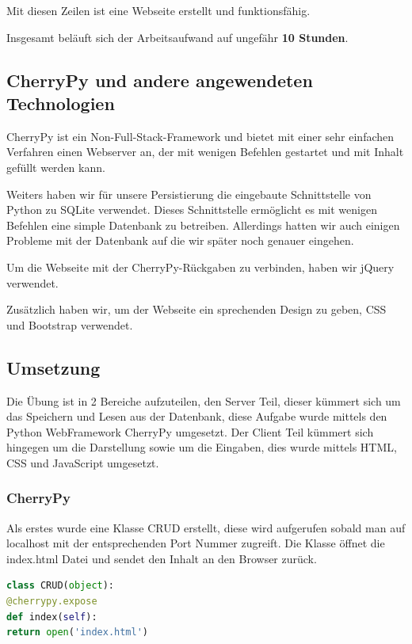Mit diesen Zeilen ist eine Webseite erstellt und funktionsfähig.

Insgesamt beläuft sich der Arbeitsaufwand auf ungefähr \textbf{10 Stunden}.

\subsection{CherryPy und andere angewendeten Technologien}

CherryPy ist ein Non-Full-Stack-Framework und bietet mit einer sehr einfachen Verfahren einen Webserver an, der mit wenigen Befehlen gestartet und mit Inhalt gefüllt werden kann.

Weiters haben wir für unsere Persistierung die eingebaute Schnittstelle von Python zu SQLite verwendet. Dieses Schnittstelle ermöglicht es mit wenigen Befehlen eine simple Datenbank zu betreiben. Allerdings hatten wir auch einigen Probleme mit der Datenbank auf die wir später noch genauer eingehen.

Um die Webseite mit der CherryPy-Rückgaben zu verbinden, haben wir jQuery verwendet. 

Zusätzlich haben wir, um der Webseite ein sprechenden Design zu geben, CSS und Bootstrap verwendet. 


\subsection{Umsetzung}

Die Übung ist in 2 Bereiche aufzuteilen, den Server Teil, dieser kümmert sich um das Speichern und Lesen aus der Datenbank, diese Aufgabe wurde mittels den Python WebFramework CherryPy umgesetzt. Der Client Teil kümmert sich hingegen um die Darstellung sowie um die Eingaben, dies wurde mittels HTML, CSS und JavaScript umgesetzt.

\subsubsection{CherryPy}

Als erstes wurde eine Klasse CRUD erstellt, diese wird aufgerufen sobald man auf localhost mit der entsprechenden Port Nummer zugreift. Die Klasse öffnet die index.html Datei und sendet den Inhalt an den Browser zurück.

\begin{lstlisting}[language=Python, caption=Klasse zur Darstellung der Index.html]
class CRUD(object):
@cherrypy.expose
def index(self):
return open('index.html')
\end{lstlisting}

